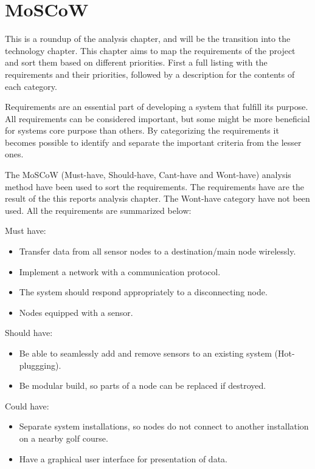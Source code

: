 \chapter{MoSCoW}
This is a roundup of the analysis chapter, and will be the transition into the technology chapter. This chapter aims to map the requirements of the project and sort them based on different priorities. First a full listing with the requirements and their priorities, followed by a description for the contents of each category.

Requirements are an essential part of developing a system that fulfill its purpose. All requirements can be considered important, but some might be more beneficial for systems core purpose than others. By categorizing the requirements it becomes possible to identify and separate the important criteria from the lesser ones. 

The MoSCoW (Must-have, Should-have, Cant-have and Wont-have) analysis method have been used to sort the requirements. The requirements have are the result of the this reports analysis chapter. The Wont-have category have not been used. All the requirements are summarized below:


Must have:
\begin{itemize}
\item Transfer data from all sensor nodes to a destination/main node wirelessly.
\item Implement a network with a communication protocol.
\item The system should respond appropriately to a disconnecting node.
\item Nodes equipped with a sensor.
\end{itemize}

Should have:
\begin{itemize}
\item Be able to seamlessly add and remove sensors to an existing system (Hot-pluggging).
\item Be modular build, so parts of a node can be replaced if destroyed.
\end{itemize}

Could have:
\begin{itemize}
\item Separate system installations, so nodes do not connect to another installation on a nearby golf course.
\item Have a graphical user interface for presentation of data.
\end{itemize}

